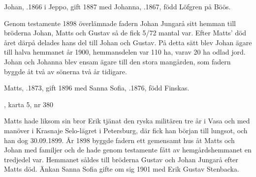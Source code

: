 %
Johan, .1866 i Jeppo, gift 1887 med Johanna, .1867, född Löfgren på Böös.
\begin{jhchildren}
  \item {}
  \item {}
  \item {}
  \item {}
  \item {}
  \item {}
\end{jhchildren}
Genom testamente 1898 överlämnade fadern Johan Jungarå sitt hemman till bröderna Johan, Matts och Gustav så de fick 5/72 mantal var. Efter Matts' död året därpå delades hans del till Johan och Gustav. På detta sätt blev Johan ägare till halva hemmanet år 1900, hemmansdelen var 110 ha, varav 20 ha odlad jord. Johan och Johanna blev ensam ägare till den stora mangården, som fadern byggde åt två av sönerna två år tidigare.


%
Matts, .1873, gift 1896 med Sanna Sofia, .1876, född Finskas.
\begin{jhchildren}
  \item {}
  \item {}, karta 5, nr 380
\end{jhchildren}
Matts hade liksom sin bror Erik tjänat den ryska militären tre år i Vasa och med manöver i Krasnaje Selo-lägret i Petersburg, där fick han början till lungsot, och han dog 30.09.1899. År 1898 byggde fadern ett gemensamt hus åt Matts och Johan med familjer och de hade genom testamente fått av hemgårdshemmanet en tredjedel var. Hemmanet såldes till bröderna Gustav och Johan Jungarå efter Matts död. Änkan Sanna Sofia gifte om sig 1901 med Erik Gustav Stenbacka.




